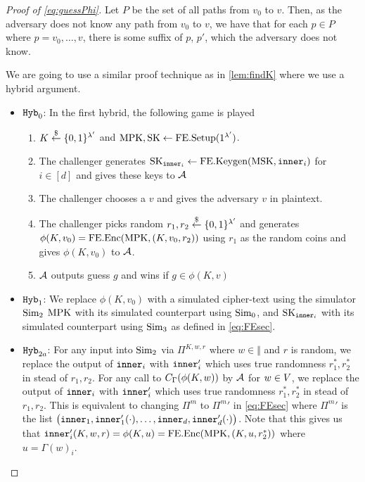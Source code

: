 \begin{proof}[Proof of \cref{eq:guessPhi}]
	Let $P$ be the set of all paths from $v_0$ to $v$. Then, as the adversary does not know any path from $v_0$ to $v$,
	we have that for each $p \in P$ where $p = v_0, \dots, v$, there is some suffix of $p$, $p'$, which the adversary does not know.

	We are going to use a similar proof technique as in \cref{lem:findK} where we use a hybrid argument.
	\begin{itemize}
		\item $\texttt{Hyb}_0$: In the first hybrid, the following game is played
			\begin{enumerate}
				\item $K \overset{\$}{\gets} \{0,1\}^{\lambda'}$ and $\text{MPK}, \text{SK} \gets \text{FE.Setup}(1^{\lambda'})$.
				\item The challenger generates $\text{SK}_{\texttt{inner}_i} \gets \text{FE.Keygen}(\text{MSK}, \texttt{inner}_i)$ for $i \in [d]$ and gives these keys to $\mathcal{A}$
				\item The challenger chooses a $v$ and gives the adversary $v$ in plaintext.
				\item The challenger picks random $r_1, r_2 \overset{\$}{\gets} \{0,1\}^{\lambda'}$ and generates $\phi(K, v_0) = \text{FE.Enc}(\text{MPK}, (K, v_0, r_2))$ using $r_1$ as the random coins and gives $\phi(K, v_0)$ to $\mathcal{A}$.
				\item $\mathcal{A}$ outputs guess $g$ and wins if $g \in \phi(K, v)$
			\end{enumerate}
		\item $\texttt{Hyb}_1$: We replace $\phi(K, v_0)$ with a simulated cipher-text using the simulator $\text{Sim}_2$ 
		$\text{MPK}$ with its simulated counterpart using $\text{Sim}_0$, and $\text{SK}_{\texttt{inner}_i}$ with its simulated counterpart using $\text{Sim}_3$ as defined in \cref{eq:FEsec}.

		\item $\texttt{Hyb}_{2a}$: For any input into $\text{Sim}_2$ via $\Pi^{K, w, r}$ where $w \in \Vert$
		and $r$ is random, we replace the output of $\texttt{inner}_i$ with $\texttt{inner}_i'$ which uses true randomness $r_1^*, r_2^*$ in stead of $r_1, r_2$.
		For any call to $C_\Gamma(\phi(K, w))$ by $\mathcal{A}$ for $w \in V$,
		we replace the output of $\texttt{inner}_i$ with $\texttt{inner}_i'$ which uses true randomness $r_1^*, r_2^*$ in stead of $r_1, r_2$.
		This is equivalent to changing $\Pi^m$ to ${\Pi^m}'$ in \cref{eq:FEsec} where ${\Pi^{m}}'$ is 
		the list $\big(\texttt{inner}_1, \texttt{inner}_1'(\cdot), \dots, \texttt{inner}_d, \texttt{inner}_d'(\cdot)\big)$.
		Note that this gives us that $\texttt{inner}_i'(K, w, r) = \phi(K, u) = \text{FE.Enc}(\text{MPK}, (K, u, r^*_2))$ where $u = \Gamma(w)_i$.


\end{itemize}
\end{proof}

